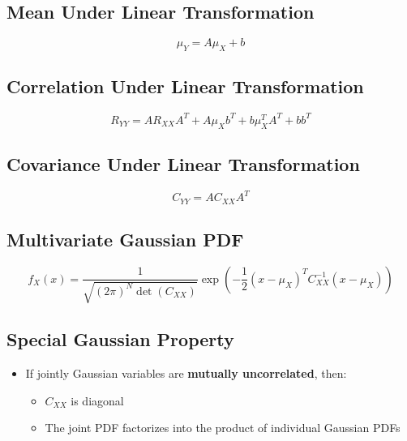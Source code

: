 \documentclass[12pt]{article}
\begin{document}
\subsection{Mean Under Linear Transformation}

\[
\boxed{\mu_Y = A\mu_X + b}
\]

\subsection{Correlation Under Linear Transformation}

\[
\boxed{R_{YY} = AR_{XX}A^T + A\mu_X b^T + b\mu_X^T A^T + bb^T}
\]

\subsection{Covariance Under Linear Transformation}

\[
\boxed{C_{YY} = AC_{XX}A^T}
\]

\subsection{Multivariate Gaussian PDF}

\[
\boxed{
f_X(x) =
\frac{1}{\sqrt{(2\pi)^N \det(C_{XX})}}
\exp\left(
-\frac{1}{2}(x-\mu_X)^T C_{XX}^{-1}(x-\mu_X)
\right)
}
\]

\subsection{Special Gaussian Property}

\begin{itemize}
    \item If jointly Gaussian variables are \textbf{mutually uncorrelated}, then:
    \begin{itemize}
        \item \(C_{XX}\) is diagonal
        \item The joint PDF factorizes into the product of individual Gaussian PDFs
    \end{itemize}
\end{itemize}
\end{document}
